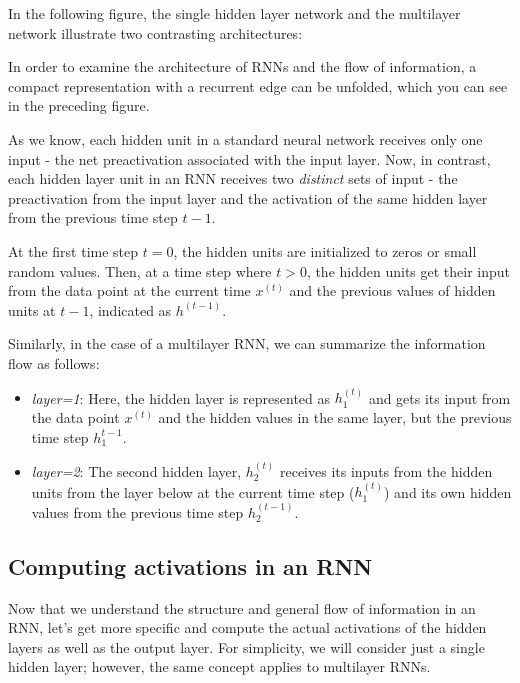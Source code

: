 \documentclass[11pt]{article}
\providecommand{\tightlist}{%
      \setlength{\itemsep}{0pt}\setlength{\parskip}{0pt}}
\begin{document}
In the following figure, the single hidden layer network and the
multilayer network illustrate two contrasting architectures:

    In order to examine the architecture of RNNs and the flow of
information, a compact representation with a recurrent edge can be
unfolded, which you can see in the preceding figure.

As we know, each hidden unit in a standard neural network receives only
one input - the net preactivation associated with the input layer. Now,
in contrast, each hidden layer unit in an RNN receives two
\emph{distinct} sets of input - the preactivation from the input layer
and the activation of the same hidden layer from the previous time step
\(t-1\).

At the first time step \(t=0\), the hidden units are initialized to
zeros or small random values. Then, at a time step where \(t>0\), the
hidden units get their input from the data point at the current time
\(x^{(t)}\) and the previous values of hidden units at \(t-1\),
indicated as \(h^{(t-1)}\).

Similarly, in the case of a multilayer RNN, we can summarize the
information flow as follows:

\begin{itemize}
\tightlist
\item
  \emph{layer=1}: Here, the hidden layer is represented as \(h_1^{(t)}\)
  and gets its input from the data point \(x^{(t)}\) and the hidden
  values in the same layer, but the previous time step \(h_1^{t-1}\).
\item
  \emph{layer=2}: The second hidden layer, \(h_2^{(t)}\) receives its
  inputs from the hidden units from the layer below at the current time
  step (\(h_1^{(t)}\)) and its own hidden values from the previous time
  step \(h_2^{(t-1)}\).
\end{itemize}

    \subsection{Computing activations in an
RNN}\label{computing-activations-in-an-rnn}

    Now that we understand the structure and general flow of information in
an RNN, let's get more specific and compute the actual activations of
the hidden layers as well as the output layer. For simplicity, we will
consider just a single hidden layer; however, the same concept applies
to multilayer RNNs.
\end{document}
